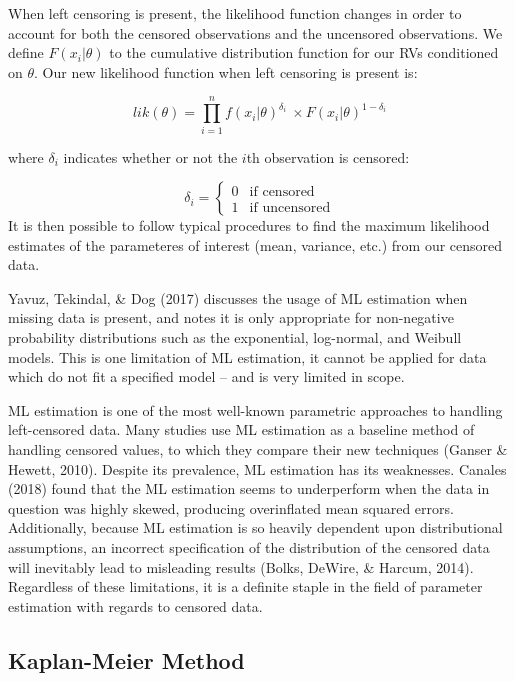 \documentclass[12pt, twoside]{amherstthesis}
\begin{document}
When left censoring is present, the likelihood function changes in order to account for both the censored observations and the uncensored observations. We define \(F(x_i|\theta)\) to the cumulative distribution function for our RVs conditioned on \(\theta\). Our new likelihood function when left censoring is present is:

\[lik(\theta) = \prod_{i=1}^n f(x_i|\theta)^{\delta_{i}} \ \times F(x_i|\theta)^{1-{\delta_{i}}}\]

\noindent where \(\delta_{i}\) indicates whether or not the \(i\)th observation is censored:

\[\delta_i =
\begin{cases}
  0 & \text{if censored} \\
  1 & \text{if uncensored}
\end{cases}\]
It is then possible to follow typical procedures to find the maximum likelihood estimates of the parameteres of interest (mean, variance, etc.) from our censored data.

Yavuz, Tekindal, \& Dog (2017) discusses the usage of ML estimation when missing data is present, and notes it is only appropriate for non-negative probability distributions such as the exponential, log-normal, and Weibull models. This is one limitation of ML estimation, it cannot be applied for data which do not fit a specified model -- and is very limited in scope.

ML estimation is one of the most well-known parametric approaches to handling left-censored data. Many studies use ML estimation as a baseline method of handling censored values, to which they compare their new techniques (Ganser \& Hewett, 2010). Despite its prevalence, ML estimation has its weaknesses. Canales (2018) found that the ML estimation seems to underperform when the data in question was highly skewed, producing overinflated mean squared errors. Additionally, because ML estimation is so heavily dependent upon distributional assumptions, an incorrect specification of the distribution of the censored data will inevitably lead to misleading results (Bolks, DeWire, \& Harcum, 2014). Regardless of these limitations, it is a definite staple in the field of parameter estimation with regards to censored data.

\hypertarget{rkm}{%
\subsection{Kaplan-Meier Method}\label{rkm}}
\end{document}
